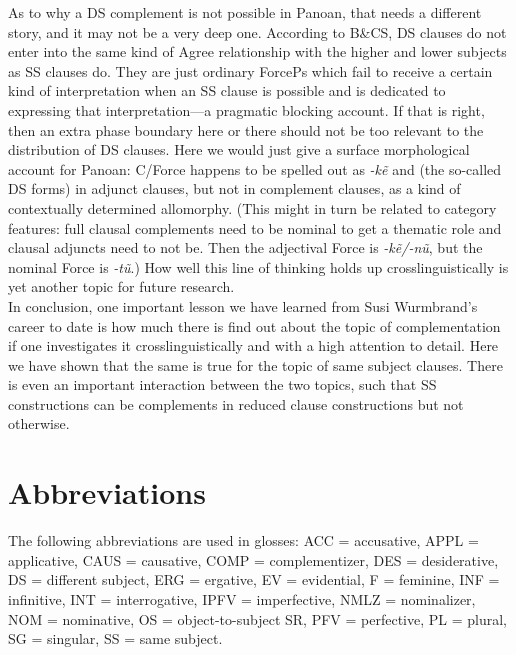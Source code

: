 \documentclass[output=paper,colorlinks,citecolor=brown,
]{langscibook}
\renewcommand{\sc}[1]{\textsc{#1}}
\begin{document}
As to why a DS complement is not possible in Panoan, that needs a different story, and it may not be a very deep one. According to B\&CS, DS clauses do not enter into the same kind of Agree relationship with the higher and lower subjects as SS clauses do. They are just ordinary ForcePs which fail to receive a certain kind of interpretation when an SS clause is possible and is dedicated to expressing that interpretation—a pragmatic blocking account. If that is right, then an extra phase boundary here or there should not be too relevant to the distribution of DS clauses. Here we would just give a surface morphological account for Panoan: C/Force happens to be spelled out as \textit{-kẽ} and  (the so-called DS forms) in adjunct clauses, but not in complement clauses, as a kind of contextually determined allomorphy. (This might in turn be related to category features: full clausal complements need to be nominal to get a thematic role and clausal adjuncts need to not be. Then the adjectival Force is \textit{-kẽ/-nũ}, but the nominal Force is \textit{-tũ}.) How well this line of thinking holds up crosslinguistically is yet another topic for future research.\\

In conclusion, one important lesson we have learned from Susi Wurmbrand’s career to date is how much there is find out about the topic of complementation if one investigates it crosslinguistically and with a high attention to detail. Here we have shown that the same is true for the topic of same subject clauses. There is even an important interaction between the two topics, such that SS constructions can be complements in reduced clause constructions but not otherwise.


\section*{Abbreviations}

The following abbreviations are used in glosses: \sc{ACC} = accusative, \sc{APPL} = applicative, \sc{CAUS} = causative, \sc{COMP} = complementizer, \sc{DES} = desiderative, \sc{DS} = different subject, \sc{ERG} = ergative, \sc{EV} = evidential, \sc{F} = feminine, \sc{INF} = infinitive, \sc{INT} = interrogative, \sc{IPFV} = imperfective, \sc{NMLZ} = nominalizer, \sc{NOM} = nominative, \sc{OS} = object-to-subject SR, \sc{PFV} = perfective, \sc{PL} = plural, \sc{SG} = singular, \sc{SS} = same subject.

\printbibliography[heading=subbibliography,notkeyword=this]
\end{document}
